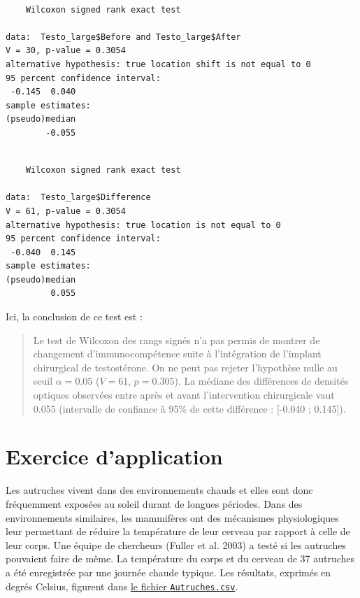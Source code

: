 \documentclass[
  french,
  a4paper,
  DIV=11,
  numbers=noendperiod,
  oneside]{scrreprt}
\newenvironment{Shaded}{}{}
\newcommand{\AttributeTok}[1]{\textcolor[rgb]{0.84,0.23,0.29}{#1}}
\newcommand{\ConstantTok}[1]{\textcolor[rgb]{0.00,0.36,0.77}{#1}}
\newcommand{\DecValTok}[1]{\textcolor[rgb]{0.00,0.36,0.77}{#1}}
\newcommand{\FunctionTok}[1]{\textcolor[rgb]{0.44,0.26,0.76}{#1}}
\newcommand{\NormalTok}[1]{\textcolor[rgb]{0.14,0.16,0.18}{#1}}
\newcommand{\SpecialCharTok}[1]{\textcolor[rgb]{0.00,0.36,0.77}{#1}}
\begin{document}
\begin{verbatim}

    Wilcoxon signed rank exact test

data:  Testo_large$Before and Testo_large$After
V = 30, p-value = 0.3054
alternative hypothesis: true location shift is not equal to 0
95 percent confidence interval:
 -0.145  0.040
sample estimates:
(pseudo)median 
        -0.055 
\end{verbatim}

\begin{Shaded}
\end{Shaded}

\begin{verbatim}

    Wilcoxon signed rank exact test

data:  Testo_large$Difference
V = 61, p-value = 0.3054
alternative hypothesis: true location is not equal to 0
95 percent confidence interval:
 -0.040  0.145
sample estimates:
(pseudo)median 
         0.055 
\end{verbatim}

Ici, la conclusion de ce test est :

\begin{quote}
Le test de Wilcoxon des rangs signés n'a pas permis de montrer de
changement d'immunocompétence suite à l'intégration de l'implant
chirurgical de testostérone. On ne peut pas rejeter l'hypothèse nulle au
seuil \(\alpha = 0.05\) (\(V = 61\), \(p = 0.305\)). La médiane des
différences de densités optiques observées entre après et avant
l'intervention chirurgicale vaut 0.055 (intervalle de confiance à 95\%
de cette différence : {[}-0.040 ; 0.145{]}).
\end{quote}

\section{Exercice d'application}\label{exercice-dapplication}

Les autruches vivent dans des environnements chauds et elles sont donc
fréquemment exposées au soleil durant de longues périodes. Dans des
environnements similaires, les mammifères ont des mécanismes
physiologiques leur permettant de réduire la température de leur cerveau
par rapport à celle de leur corps. Une équipe de chercheurs (Fuller et
al. 2003) a testé si les autruches pouvaient faire de même. La
température du corps et du cerveau de 37 autruches a été enregistrée par
une journée chaude typique. Les résultats, exprimés en degrés Celsius,
figurent dans \href{data/Autruches.csv}{le fichier
\texttt{Autruches.csv}}.
\end{document}
